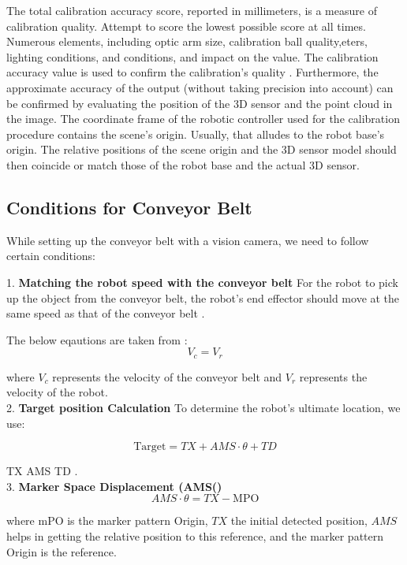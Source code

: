 \documentclass[12pt]{article}
\begin{document}
 The total calibration accuracy score, reported in millimeters, is a measure of calibration quality.  Attempt to score the lowest possible score at all times.  Numerous elements, including optic arm size, calibration ball quality,eters, lighting conditions, and conditions, and impact on the value. The calibration accuracy value is used to confirm the calibration's quality . Furthermore, the approximate accuracy of the output (without taking precision into account) can be confirmed by evaluating the position of the 3D sensor and the point cloud in the image.
 The coordinate frame of the robotic controller used for the calibration procedure contains the scene's origin. Usually, that alludes to the robot base's origin.  The relative positions of the scene origin and the 3D sensor model should then coincide or match those of the robot base and the actual 3D sensor.

 \subsection{Conditions for Conveyor Belt}
While setting up the conveyor belt with a vision camera, we need to follow certain conditions:

1. \textbf{Matching the robot speed with the conveyor belt} For the robot to pick up the object from the conveyor belt, the robot's end effector should move at the same speed as that of the conveyor belt \cite{ref21}.

The below eqautions are taken from : \cite{ref21}
\[
V_c = V_r 
\]

where \( V_c \) represents the velocity of the conveyor belt and \( V_r \) represents the velocity of the robot\cite{ref21}.\\

2. \textbf{Target position Calculation} To determine the robot's ultimate location, we use:

\[
\text{Target} = TX + AMS \cdot \theta + TD 
\]

 TX  AMS  TD \cite{ref21}.\\


3. \textbf{Marker Space Displacement (AMS()} \\

\[
AMS \cdot \theta = TX - \text{MPO}
\]

 where mPO is the marker pattern Origin, $TX$ the initial detected position, $AMS$ helps in getting the relative position to this reference, and the marker pattern Origin is the reference\cite{ref21}.
\end{document}
